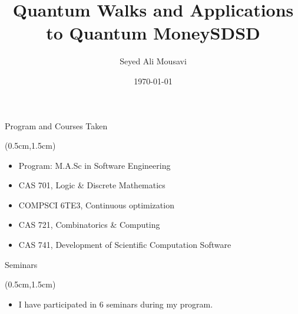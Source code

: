 \documentclass{beamer}
\title{Quantum Walks and Applications to Quantum Money}
\author{Seyed Ali Mousavi}
\institute{Supervised by Dr. Jake Doliskani}
\date{\today}
\theoremstyle{definition}
\begin{document}
\begin{frame}
    \titlepage
\end{frame}





\begin{frame}{Program and Courses Taken}

   
    
    \begin{textblock*}{12cm}(0.5cm,1.5cm)
       \begin{itemize}
        \item Program: M.A.Sc in Software Engineering
        \vspace{1cm}
        \item CAS 701,  Logic \& Discrete Mathematics
        \item COMPSCI 6TE3, Continuous optimization
        \item CAS 721, Combinatorics \& Computing
        \item CAS 741, Development of Scientific Computation Software
       \end{itemize}
    \end{textblock*}

    \title{SDSD}
    


\end{frame}







\begin{frame}{Seminars}
    
    \begin{textblock*}{12cm}(0.5cm,1.5cm)
       \begin{itemize}
        \item I have participated in 6 seminars during my program.
       \end{itemize}
    \end{textblock*}
    

\end{frame}
\end{document}

